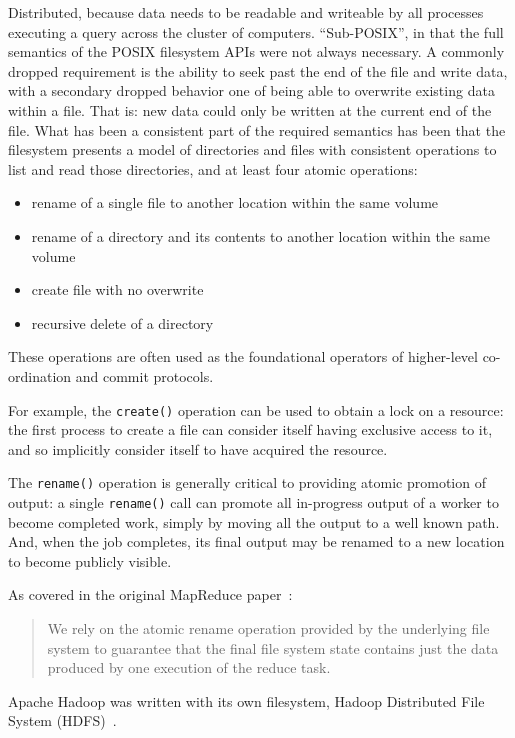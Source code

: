 \documentclass[conference]{IEEEtran}
\begin{document}
Distributed, because data needs to be readable and writeable by all processes
executing a query across the cluster of computers.
``Sub-POSIX'', in that the full semantics of the POSIX filesystem APIs were not always necessary.
A commonly dropped requirement is the ability to seek past the end of the file and
write data, with a secondary dropped behavior one of being able to overwrite existing
data within a file.
That is: new data could only be written at the current end of the file.
What has been a consistent part of the required semantics has been that the filesystem
presents a model of directories and files with consistent operations to list and
read those directories, and at least four atomic operations:

\begin{itemize}
  \item rename of a single file to another location within the same volume 
  \item rename of a directory and its contents to another location within the same volume 
  \item create file with no overwrite 
  \item recursive delete of a directory 
\end{itemize}

These operations are often used as the foundational operators of higher-level
co-ordination and commit protocols.

For example, the \texttt{create()} operation can be used to obtain a lock on a resource:
the first process to create a file can consider itself having exclusive access to it,
and so implicitly consider itself to have acquired the resource.

The \texttt{rename()} operation is generally critical to providing atomic promotion
of output: a single \texttt{rename()} call can promote all in-progress output
of a worker to become completed work, simply by moving all the output to a well known path.
And, when the job completes, its final output may be renamed to a new location to become
publicly visible.

As covered in the original MapReduce paper\ \cite{MapReduce}:

\begin{quote}
We rely on the atomic rename operation provided by the underlying file system
to guarantee that the final file system state contains just the data produced
by one execution of the reduce task.
\end{quote}


Apache Hadoop was written with its own filesystem, Hadoop Distributed File System
(HDFS)\ \cite{Chansler2011}.
\end{document}
